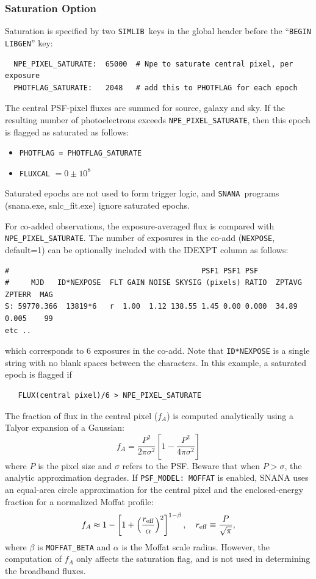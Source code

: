 \documentclass[12pt]{article}
\newcommand{\snana}{{\tt SNANA}}
\newcommand{\simlib}{{\tt SIMLIB}}
\begin{document}
{%
\clearpage
\subsubsection{Saturation Option}
\label{sssec:saturation}

Saturation is specified by two \simlib\ keys in the global header
before the ``{\tt BEGIN LIBGEN}'' key:
\begin{verbatim}
  NPE_PIXEL_SATURATE:  65000  # Npe to saturate central pixel, per exposure
  PHOTFLAG_SATURATE:   2048   # add this to PHOTFLAG for each epoch
\end{verbatim}
%
The central PSF-pixel fluxes are summed for source, galaxy and sky.
If the resulting number of photoelectrons exceeds 
{\tt NPE\_PIXEL\_SATURATE}, then this epoch is flagged 
as saturated as follows:
\begin{itemize}[noitemsep]
   \item {\tt PHOTFLAG = PHOTFLAG\_SATURATE}
   \item {\tt FLUXCAL} $= 0 \pm 10^8$
\end{itemize}
%
Saturated epochs are not used to form trigger logic,
and \snana\ programs (snana.exe, snlc\_fit.exe) ignore saturated epochs.

For co-added observations, the exposure-averaged flux is compared 
with {\tt NPE\_PIXEL\_SATURATE}. The number of exposures in the 
co-add ({\tt NEXPOSE}, default=1) can be optionally included 
with the IDEXPT column as follows:
\begin{verbatim}
#                                            PSF1 PSF1 PSF
#     MJD   ID*NEXPOSE  FLT GAIN NOISE SKYSIG (pixels) RATIO  ZPTAVG ZPTERR  MAG 
S: 59770.366  13819*6   r  1.00  1.12 138.55 1.45 0.00 0.000  34.89  0.005    99
etc ..
\end{verbatim}
%
which corresponds to 6 exposures in the co-add. 
Note that {\tt ID*NEXPOSE} is a single string with no blank spaces 
between the characters.
In this example, a saturated epoch is flagged if 
\begin{verbatim}
   FLUX(central pixel)/6 > NPE_PIXEL_SATURATE
\end{verbatim}

\medskip
\newcommand{\fA}{f_{A}}
\noindent The fraction of flux in the central pixel ($\fA$) 
is computed analytically using a Talyor expansion of a Gaussian:
$$ \fA = \frac{P^2}{2\pi\sigma^2} 
   \left[ 1 - \frac{P^2}{4\pi\sigma^2} \right] 
$$
%
where $P$ is the pixel size and $\sigma$ refers to the PSF.
Beware that when $P > \sigma$, the analytic approximation degrades.
If {\tt PSF\_MODEL: MOFFAT} is enabled, SNANA uses an equal-area
circle approximation for the central pixel and the enclosed-energy
fraction for a normalized Moffat profile:
$$
 \fA \approx 1 - \left[1 + \left(\frac{r_{\rm eff}}{\alpha}\right)^2 \right]^{1-\beta},
 \quad r_{\rm eff} \equiv \frac{P}{\sqrt{\pi}},
$$
where $\beta$ is {\tt MOFFAT\_BETA} and $\alpha$ is the Moffat scale radius.
However, the computation of $\fA$ only affects the saturation flag,
and is not used in determining the broadband fluxes.

}
\end{document}
